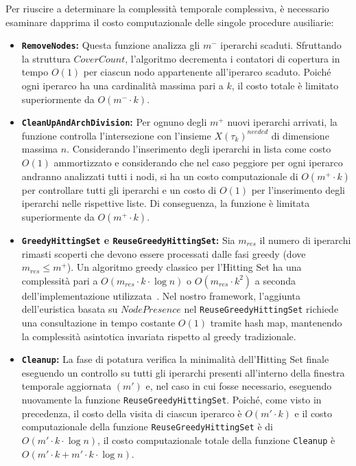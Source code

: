 Per riuscire a determinare la complessità temporale complessiva, è necessario esaminare dapprima il costo computazionale delle singole procedure ausiliarie:
\begin{itemize}
    \item \textbf{\texttt{RemoveNodes}:} Questa funzione analizza gli $m^-$ iperarchi scaduti.
    Sfruttando la struttura $CoverCount$, l'algoritmo decrementa i contatori di copertura in tempo $O(1)$ per ciascun nodo appartenente all'iperarco scaduto.
    Poiché ogni iperarco ha una cardinalità massima pari a $k$, il costo totale è limitato superiormente da $O(m^- \cdot k)$.
    \item \textbf{\texttt{CleanUpAndArchDivision}:} Per ognuno degli $m^+$ nuovi iperarchi arrivati, la funzione controlla l'intersezione con l'insieme $X(\tau_k)^{needed}$ di dimensione massima $n$.
    Considerando l'inserimento degli iperarchi in lista come costo $O(1)$ ammortizzato e considerando che nel caso peggiore per ogni iperarco andranno analizzati tutti i nodi, si ha un costo computazionale di $O(m^+ \cdot k)$ per controllare tutti gli iperarchi e un costo di $O(1)$ per l'inserimento degli iperarchi nelle rispettive liste.
    Di conseguenza, la funzione è limitata superiormente da $O(m^+ \cdot k)$.
    \item \textbf{\texttt{GreedyHittingSet} e \texttt{ReuseGreedyHittingSet}:} Sia $m_{res}$ il numero di iperarchi rimasti scoperti che devono essere processati dalle fasi greedy (dove $m_{res} \le m^+$).
    Un algoritmo greedy classico per l'Hitting Set ha una complessità pari a $O(m_{res} \cdot k \cdot \log n)$ o $O(m_{res} \cdot k^2)$ a seconda dell'implementazione utilizzata~\cite{johnson1974, chvatal1979}.
    Nel nostro framework, l'aggiunta dell'euristica basata su $NodePresence$ nel \texttt{ReuseGreedyHittingSet} richiede una consultazione in tempo costante $O(1)$ tramite hash map, mantenendo la complessità asintotica invariata rispetto al greedy tradizionale.
    \item \textbf{\texttt{Cleanup}:} La fase di potatura verifica la minimalità dell'Hitting Set finale eseguendo un controllo su tutti gli iperarchi presenti all'interno della finestra temporale aggiornata $(m')$ e, nel caso in cui fosse necessario, eseguendo nuovamente la funzione \texttt{ReuseGreedyHittingSet}.
    Poiché, come visto in precedenza, il costo della visita di ciascun iperarco è $O(m'\cdot k)$ e il costo computazionale della funzione \texttt{ReuseGreedyHittingSet} è di $O(m' \cdot k \cdot \log n)$, il costo computazionale totale della funzione \texttt{Cleanup} è $O(m'\cdot k + m' \cdot k \cdot \log n)$.
\end{itemize}
